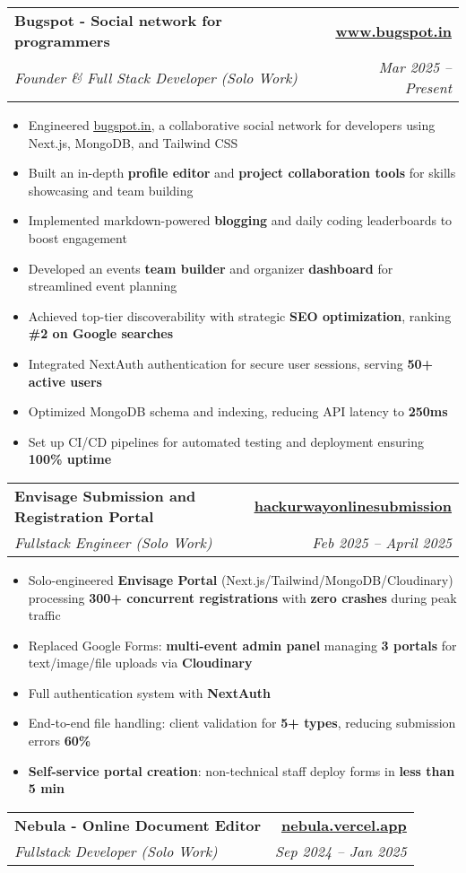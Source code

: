\documentclass[letterpaper,11pt]{article}
\makeatletter
\newcommand{\resumeItem}[1]{
  \item\small{
    {#1 \vspace{0pt}}
  }
}
\newcommand{\resumeSubheading}[4]{
  \vspace{-2pt}\item
    \begin{tabular*}{1.0\textwidth}[t]{l@{\extracolsep{\fill}}r}
      \textbf{#1} & \textbf{\small #2} \\
      \textit{\small#3} & \textit{\small #4} \\
    \end{tabular*}\vspace{-7pt}
}
\newcommand{\resumeItemListStart}{\begin{itemize}}
\newcommand{\resumeItemListEnd}{\end{itemize}\vspace{-5pt}}
\makeatother
\begin{document}
                \resumeSubheading
  {Bugspot - Social network for programmers}{\href{https://www.bugspot.in}{\color{blue}\underline{www.bugspot.in}}}
  {Founder \& Full Stack Developer (Solo Work)}{Mar 2025 – Present}
 \resumeItemListStart
    \resumeItem{Engineered \href{https://www.bugspot.in}{\color{blue}\underline{bugspot.in}}, a collaborative social network for developers using Next.js, MongoDB, and Tailwind CSS}
    \resumeItem{Built an in-depth \textbf{profile editor} and \textbf{project collaboration tools} for skills showcasing and team building}
    \resumeItem{Implemented markdown-powered \textbf{blogging} and daily coding leaderboards to boost engagement}
    \resumeItem{Developed an events \textbf{team builder} and organizer \textbf{dashboard} for streamlined event planning}
    \resumeItem{Achieved top-tier discoverability with strategic \textbf{SEO optimization}, ranking \textbf{\#2 on Google searches}}
    \resumeItem{Integrated NextAuth authentication for secure user sessions, serving \textbf{50+ active users}}
    \resumeItem{Optimized MongoDB schema and indexing, reducing API latency to \textbf{250ms}}
    \resumeItem{Set up CI/CD pipelines for automated testing and deployment ensuring \textbf{100\% uptime}}
\resumeItemListEnd

    \vspace{0pt}

            \resumeSubheading{Envisage Submission and Registration Portal}{\href{https://hackurwayonlinesubmission.vercel.app}{\color{blue}\underline{hackurwayonlinesubmission}}}{Fullstack Engineer (Solo Work)}{Feb 2025 -- April 2025} 
               \resumeItemListStart
    \resumeItem{Solo-engineered \textbf{Envisage Portal} (Next.js/Tailwind/MongoDB/Cloudinary) processing \textbf{300+ concurrent registrations} with \textbf{zero crashes} during peak traffic}
    \resumeItem{Replaced Google Forms: \textbf{multi-event admin panel} managing \textbf{3 portals} for text/image/file uploads via \textbf{Cloudinary}}
    \resumeItem{Full authentication system with \textbf{NextAuth}}
    \resumeItem{End-to-end file handling: client validation for \textbf{5+ types}, reducing submission errors \textbf{60\%}}
    \resumeItem{\textbf{Self-service portal creation}: non-technical staff deploy forms in \textbf{less than 5 min}}
\resumeItemListEnd
            
\vspace{-2pt}
 \resumeSubheading{Nebula - Online Document Editor}{\href{https://nebula.vercel.app}{\color{blue}\underline{nebula.vercel.app}}}{Fullstack Developer (Solo Work)}{Sep 2024 -- Jan 2025} 
    
\end{document}
